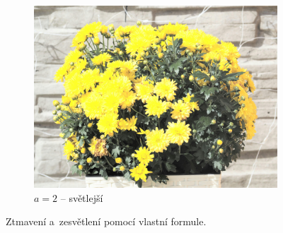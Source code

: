 \documentclass[11pt, a4paper, titlepage]{article}
\begin{document}
\begin{figure}[h]
    \begin{subfigure}[t]{0.25\textwidth}
        \vskip 0pt
        \includegraphics[width=1.0\textwidth]{kvetina_mul_up.jpg}
        \caption{$a = 2$ -- světlejší}
    \end{subfigure}
    \caption{Ztmavení a~zesvětlení pomocí vlastní formule.}
    \label{fig:multiplication-luma}
\end{figure}
\end{document}
